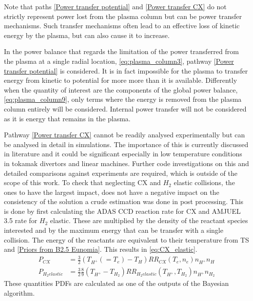 Note that paths \ref{Power transfer potential} and \ref{Power transfer CX} do not strictly represent power lost from the plasma column but can be power transfer mechanisms. Such transfer mechanisms often lead to an effective loss of kinetic energy by the plasma, but can also cause it to increase.

In the power balance that regards the limitation of the power transferred from the plasma at a single radial location, \autoref{eq:plasma_column3}, pathway \ref{Power transfer potential} is considered. It is in fact impossible for the plasma to transfer energy from kinetic to potential for more more than it is available. Differently when the quantity of interest are the components of the global power balance, \autoref{eq:plasma_column9}, only terms where the energy is removed from the plasma column entirely will be considered. Internal power transfer will not be considered as it is energy that remains in the plasma.

Pathway \ref{Power transfer CX} cannot be readily analysed experimentally but can be analysed in detail in simulations. The importance of this is currently discussed in literature and it could be significant especially in low temperature conditions in tokamak divertors and linear machines. \cite{Myatra2021,Smolders2020,Chandra2022} Further code investigations on this and detailed comparisons against experiments are required, which is outside of the scope of this work. To check that neglecting CX and $H_2$ elastic collisions, the ones to have the largest impact\cite{Chandra2022}, does not have a negative impact on the consistency of the solution a crude estimation was done in post processing. This is done by first calculating the ADAS CCD reaction rate for CX and AMJUEL 3.5 rate for $H_2$ elastic. These are multiplied by the density of the reactant species interested and by the maximum energy that can be transfer with a single collision. The energy of the reactants are equivalent to their temperature from TS and \ref{Priors from B2.5 Eunomia}. This results in \autoref{eq:CX_elastic}.
\begin{equation}
\label{eq:CX_elastic}
\begin{aligned}
  P_{CX} &= \frac{ 3 }{ 2}  (T_{H^+}(=T_e)-T_H) RR_{CX}(T_e,n_e) n_{H^+} n_{H}
  \\
  P_{H_2 elastic} &= \frac{ 3 }{ 2} \frac{8}{9} (T_{H^+}-T_{H_2}) RR_{H_2 elastic}(T_{H^+},T_{H_2})  n_{H^+} n_{H_2}
\end{aligned}
\end{equation}
These quantities PDFs are calculated as one of the outputs of the Bayesian algorithm.

